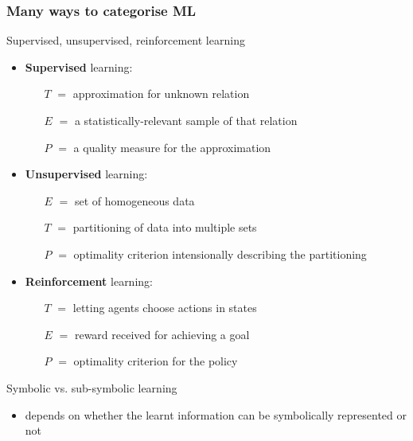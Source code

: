 \documentclass[presentation]{beamer}\mode<presentation>{\usetheme{AMSBolognaFC}}
\begin{document}
\begin{frame}[allowframebreaks]
\frametitle{Many ways to categorise ML}
    \begin{block}{Supervised, unsupervised, reinforcement learning}
        \begin{itemize}
            \item \textbf{Supervised} learning:
            \begin{itemize}
                \item[$T$] $=$ approximation for unknown \alert{relation}  
                \item[$E$] $=$ a statistically-relevant \alert{sample} of that relation
                \item[$P$] $=$ a \alert{quality measure} for the approximation
            \end{itemize}

            \item \textbf{Unsupervised} learning:
            \begin{itemize}
                \item[$E$] $=$ \alert{set} of \alert{homogeneous} data 
                \item[$T$] $=$ \alert{partitioning} of data into multiple sets
                \item[$P$] $=$ \alert{optimality criterion} intensionally describing the partitioning 
            \end{itemize} 

            \item \textbf{Reinforcement} learning:
            \begin{itemize}
                \item[$T$] $=$ letting agents choose actions in states  
                \item[$E$] $=$ \alert{reward} received for achieving a goal 
                \item[$P$] $=$ \alert{optimality criterion} for the policy
            \end{itemize} 
        \end{itemize}
    \end{block}

    \begin{block}{Symbolic vs. sub-symbolic learning}
        \begin{itemize}
            \item depends on whether the learnt information can be \alert{symbolically} represented or not
        \end{itemize}
    \end{block}


\end{frame}
\end{document}
